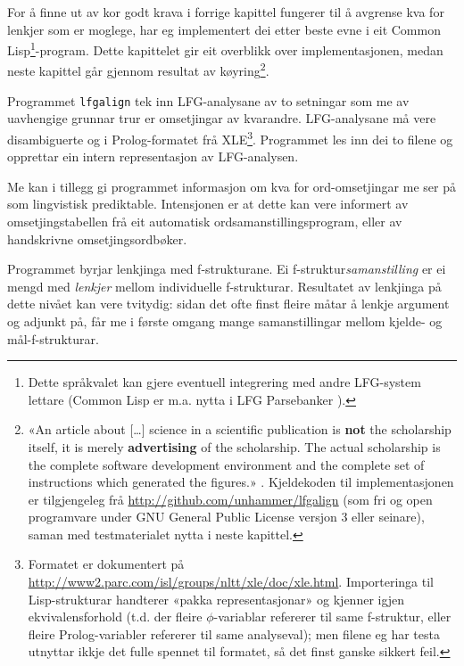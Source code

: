 \documentclass[11pt,a4paper,oneside,draft]{book}
\begin{document}
For å finne ut av kor godt krava i forrige kapittel fungerer til å
avgrense kva for lenkjer som er moglege, har eg implementert dei etter
beste evne i eit Common Lisp\footnote{Dette språkvalet kan gjere eventuell integrering med andre
        LFG-system lettare (Common Lisp er m.a. nytta i LFG
        Parsebanker \citep{rosen2009lpt}). }-program. Dette kapittelet gir eit
overblikk over implementasjonen, medan neste kapittel går gjennom
resultat av køyring\footnote{«An article about [\ldots{}] science in a scientific publication is
       \textbf{not} the scholarship itself, it is merely
       \textbf{advertising} of the scholarship. The actual scholarship
       is the complete software development environment and the
       complete set of instructions which generated the figures.»
       \citep[Jon Claerbout,~i][s.~7--8]{stodden2009err}. Kjeldekoden
       til implementasjonen er tilgjengeleg frå
       \href{http://github.com/unhammer/lfgalign}{http://github.com/unhammer/lfgalign} (som fri og open
       programvare under GNU General Public License versjon 3 eller
       seinare), saman med testmaterialet nytta i neste kapittel. }.

Programmet \texttt{lfgalign} tek inn LFG-analysane av to
setningar som me av uavhengige grunnar trur er omsetjingar av
kvarandre. LFG-analysane må vere disambiguerte og i Prolog-formatet
frå XLE\footnote{Formatet er dokumentert på
       \href{http://www2.parc.com/isl/groups/nltt/xle/doc/xle.html}{http://www2.parc.com/isl/groups/nltt/xle/doc/xle.html}. Importeringa
       til Lisp-strukturar handterer «pakka representasjonar» og
       kjenner igjen ekvivalensforhold (t.d. der fleire
       $\phi$-variablar refererer til same f-struktur, eller fleire
       Prolog-variabler refererer til same analyseval); men filene eg
       har testa utnyttar ikkje det fulle spennet til formatet, så det
       finst ganske sikkert feil. }. Programmet les inn dei to filene og opprettar ein
intern representasjon av LFG-analysen.  

Me kan i tillegg gi programmet informasjon om kva for ord-omsetjingar
me ser på som lingvistisk prediktable. Intensjonen er at dette kan
vere informert av omsetjingstabellen frå eit automatisk
ordsamanstillingsprogram, eller av handskrivne omsetjingsordbøker.

Programmet byrjar lenkjinga med f-strukturane. Ei
f-struktur\emph{samanstilling} er ei mengd med \emph{lenkjer} mellom
individuelle f-strukturar. Resultatet av lenkjinga på dette nivået kan
vere tvitydig: sidan det ofte finst fleire måtar å lenkje argument og
adjunkt på, får me i første omgang mange samanstillingar mellom
kjelde- og mål-f-strukturar.
\end{document}
